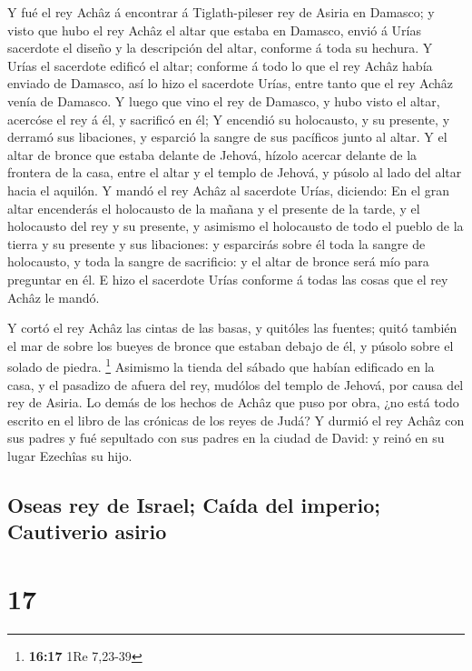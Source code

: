  Y fué el rey Achâz á encontrar á Tiglath-pileser rey de
Asiria en Damasco; y visto que hubo el rey Achâz el altar que estaba en
Damasco, envió á Urías sacerdote el diseño y la descripción del altar,
conforme á toda su hechura.  Y Urías el sacerdote edificó
el altar; conforme á todo lo que el rey Achâz había enviado de Damasco,
así lo hizo el sacerdote Urías, entre tanto que el rey Achâz venía de
Damasco.  Y luego que vino el rey de Damasco, y hubo
visto el altar, acercóse el rey á él, y sacrificó en él; 
Y encendió su holocausto, y su presente, y derramó sus libaciones, y
esparció la sangre de sus pacíficos junto al altar.  Y el
altar de bronce que estaba delante de Jehová, hízolo acercar delante de
la frontera de la casa, entre el altar y el templo de Jehová, y púsolo
al lado del altar hacia el aquilón.  Y mandó el rey Achâz
al sacerdote Urías, diciendo: En el gran altar encenderás el holocausto
de la mañana y el presente de la tarde, y el holocausto del rey y su
presente, y asimismo el holocausto de todo el pueblo de la tierra y su
presente y sus libaciones: y esparcirás sobre él toda la sangre de
holocausto, y toda la sangre de sacrificio: y el altar de bronce será
mío para preguntar en él.  E hizo el sacerdote Urías
conforme á todas las cosas que el rey Achâz le mandó.

 Y cortó el rey Achâz las cintas de las basas, y quitóles
las fuentes; quitó también el mar de sobre los bueyes de bronce que
estaban debajo de él, y púsolo sobre el solado de piedra. \footnote{\textbf{16:17}
  1Re 7,23-39}  Asimismo la tienda del sábado que habían
edificado en la casa, y el pasadizo de afuera del rey, mudólos del
templo de Jehová, por causa del rey de Asiria.  Lo demás
de los hechos de Achâz que puso por obra, ¿no está todo escrito en el
libro de las crónicas de los reyes de Judá?  Y durmió el
rey Achâz con sus padres y fué sepultado con sus padres en la ciudad de
David: y reinó en su lugar Ezechîas su hijo.

\hypertarget{oseas-rey-de-israel-cauxedda-del-imperio-cautiverio-asirio}{%
\subsection{Oseas rey de Israel; Caída del imperio; Cautiverio
asirio}\label{oseas-rey-de-israel-cauxedda-del-imperio-cautiverio-asirio}}

\hypertarget{section-16}{%
\section{17}\label{section-16}}

